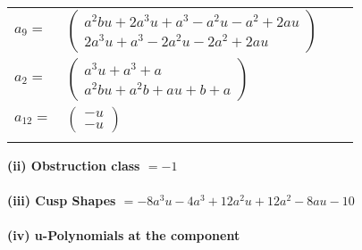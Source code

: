 \documentclass[1p]{elsarticle_modified}
\theoremstyle{definition}
\begin{document}
\begin{tabular}{m{7pt} m{180pt} m{7pt} m{180pt} }
\flushright $a_{9}=$&$\begin{pmatrix}a^2 b u+2 a^3 u+a^3- a^2 u- a^2+2 a u\\2 a^3 u+a^3-2 a^2 u-2 a^2+2 a u\end{pmatrix}$ \\
\flushright $a_{2}=$&$\begin{pmatrix}a^3 u+a^3+a\\a^2 b u+a^2 b+a u+b+a\end{pmatrix}$ \\
\flushright $a_{12}=$&$\begin{pmatrix}- u\\- u\end{pmatrix}$\\&\end{tabular}
\flushleft \textbf{(ii) Obstruction class $= -1$}\\~\\
\flushleft \textbf{(iii) Cusp Shapes $= -8 a^3 u-4 a^3+12 a^2 u+12 a^2-8 a u-10$}\\~\\
\newpage\renewcommand{\arraystretch}{1}
\flushleft \textbf{(iv) u-Polynomials at the component}\newline \\
\end{document}
